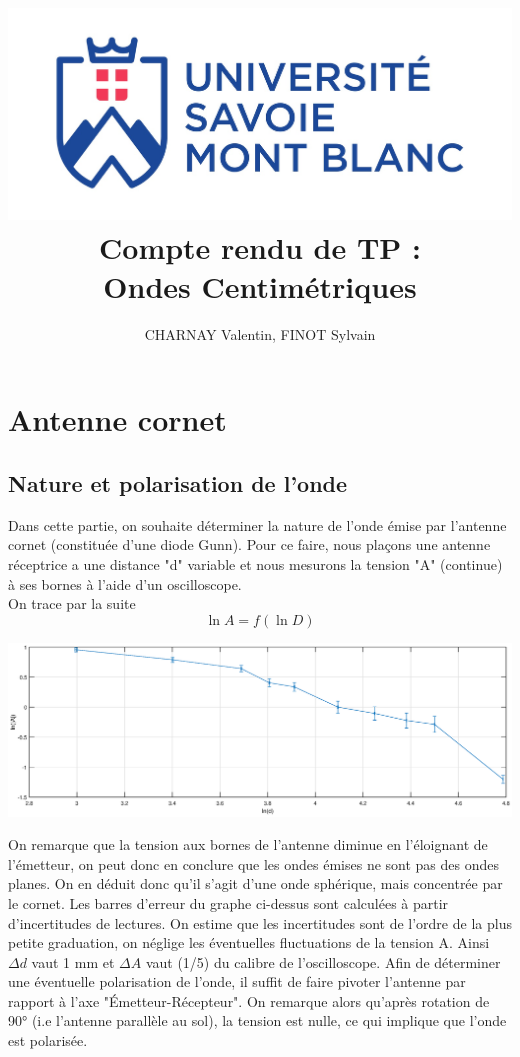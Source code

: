 \documentclass[12pt,a4paper]{article}
\author{CHARNAY Valentin, FINOT Sylvain}
\title{\includegraphics[scale=0.3]{logousmb}\\
Compte rendu de TP : \\ Ondes Centimétriques}
\begin{document}
	\maketitle
	\section{Antenne cornet}
	\subsection{Nature et polarisation de l'onde}
	Dans cette partie, on souhaite déterminer la nature de l'onde émise par l'antenne cornet (constituée d'une diode Gunn). Pour ce faire, nous plaçons une antenne réceptrice a une distance "d" variable et nous mesurons la tension "A" (continue) à ses bornes à l'aide d'un oscilloscope.\\
	On trace par la suite
	$$\ln A = f(\ln D)$$
	\begin{bigcenter}
		\includegraphics[scale=0.5]{matlab/lnA}
	\end{bigcenter}
	On remarque que la tension aux bornes de l'antenne diminue en l'éloignant de l'émetteur, on peut donc en conclure que les ondes émises ne sont pas des ondes planes. On en déduit donc qu'il s'agit d'une onde sphérique, mais concentrée par le cornet. Les barres d'erreur du graphe ci-dessus sont calculées à partir d'incertitudes de lectures. On estime que les incertitudes sont de l'ordre de la plus petite graduation, on néglige les éventuelles fluctuations de la tension A. Ainsi $\Delta d$ vaut 1 mm et $\Delta A$ vaut (1/5) du calibre de l'oscilloscope.
	Afin de déterminer une éventuelle polarisation de l'onde, il suffit de faire pivoter l'antenne par rapport à l'axe "Émetteur-Récepteur". On remarque alors qu'après rotation de 90° (i.e l'antenne parallèle au sol), la tension est nulle, ce qui implique que l'onde est polarisée.
\end{document}

